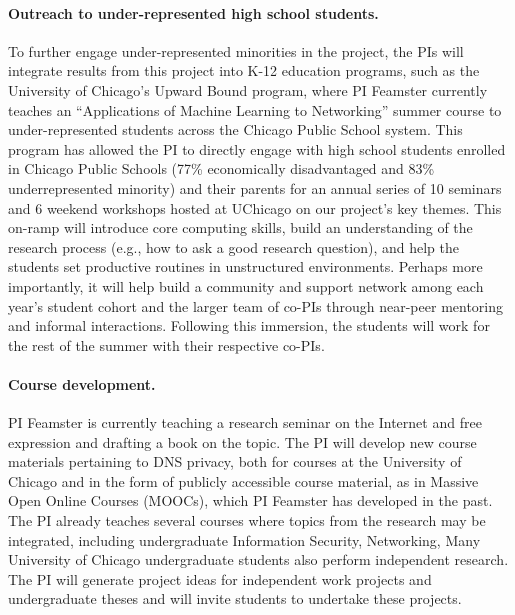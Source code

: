 \paragraph{Outreach to under-represented high school students.}
To further engage under-represented minorities in the project, the PIs will
integrate results from this project into K-12 education programs, such as the
University of Chicago's Upward Bound program, where PI Feamster currently
teaches an ``Applications of Machine Learning to Networking'' summer course to
under-represented students across the Chicago Public School system.
This program  has allowed the PI to directly engage with high
school students  enrolled in Chicago Public Schools (77\% economically
disadvantaged and 83\% underrepresented minority) and their parents for an
annual series of 10 seminars and 6 weekend workshops hosted at UChicago on our
project's key themes. 
This on-ramp will introduce core computing
skills, build an understanding of the research process (e.g., how to ask a
good research question), and help the students set productive routines in
unstructured environments.  Perhaps more importantly, it will help build a
community and support network among each year's student cohort and the larger
team of co-PIs through near-peer mentoring and informal interactions.
Following this immersion, the students will work for the rest of the summer
with their respective co-PIs.

\paragraph{Course development.} PI Feamster is currently teaching a research
seminar on the Internet and free expression and drafting a book on the topic.
The PI will develop new course materials pertaining to DNS privacy, both for
courses at the University of Chicago and in the form of publicly accessible
course material, as in Massive Open Online Courses (MOOCs), which PI Feamster
has developed in the past. The PI already teaches several courses where topics
from the research may be integrated, including undergraduate Information
Security, Networking, Many University of Chicago undergraduate students
also perform independent research. The PI will generate project ideas for
independent work projects and undergraduate theses and will invite students to
undertake these projects.


